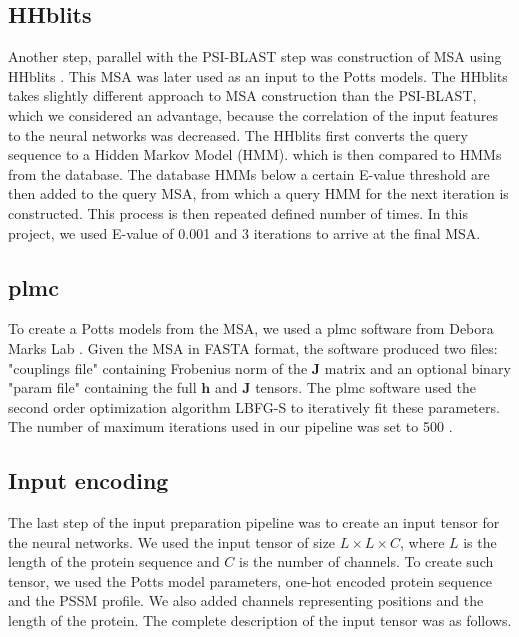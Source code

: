 
\subsection{HHblits}
Another step, parallel with the PSI-BLAST step was construction of MSA using HHblits \cite{remmert2012hhblits}.
This MSA was later used as an input to the Potts models.
The HHblits takes slightly different approach to MSA construction than the PSI-BLAST, which we considered an advantage, because the correlation of the input features to the neural networks was decreased.
The HHblits first converts the query sequence to a Hidden Markov Model (HMM).
which is then compared to HMMs from the database.
The database HMMs below a certain E-value threshold are then added to the query MSA, from which a query HMM for the next iteration is constructed.
This process is then repeated defined number of times.
In this project, we used E-value of 0.001 and 3 iterations to arrive at the final MSA.

\subsection{plmc}
To create a Potts models from the MSA, we used a plmc software from Debora Marks Lab \cite{plmc}.
Given the MSA in FASTA format, the software produced two files: "couplings file" containing Frobenius norm of the $\bm{J}$ matrix and an optional binary "param file" containing the full $\bm{h}$ and $\bm{J}$ tensors. 
The plmc software used the second order optimization algorithm LBFG-S to iteratively fit these parameters.
The number of maximum iterations used in our pipeline was set to 500 \cite{plmc}.

\subsection{Input encoding}
The last step of the input preparation pipeline was to create an input tensor for the neural networks.
We used the input tensor of size $L \times L \times C$, where $L$ is the length of the protein sequence and $C$ is the number of channels.
To create such tensor, we used the Potts model parameters, one-hot encoded protein sequence and the PSSM profile.
We also added channels representing positions and the length of the protein.
The complete description of the input tensor was as follows.

